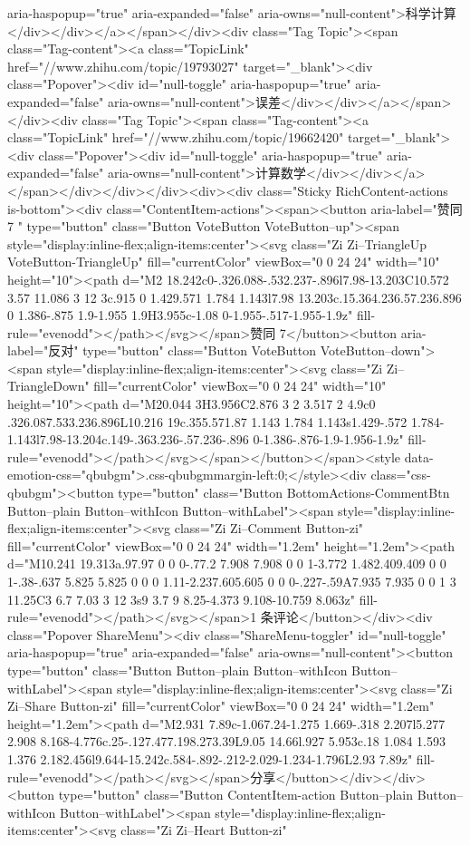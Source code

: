 aria-haspopup="true" aria-expanded="false" aria-owns="null-content">科学计算</div></div></a></span></div><div class="Tag Topic"><span class="Tag-content"><a class="TopicLink" href="//www.zhihu.com/topic/19793027" target="_blank"><div class="Popover"><div id="null-toggle" aria-haspopup="true" aria-expanded="false" aria-owns="null-content">误差</div></div></a></span></div><div class="Tag Topic"><span class="Tag-content"><a class="TopicLink" href="//www.zhihu.com/topic/19662420" target="_blank"><div class="Popover"><div id="null-toggle" aria-haspopup="true" aria-expanded="false" aria-owns="null-content">计算数学</div></div></a></span></div></div></div><div><div class="Sticky RichContent-actions is-bottom"><div class="ContentItem-actions"><span><button aria-label="赞同 7 " type="button" class="Button VoteButton VoteButton--up"><span style="display:inline-flex;align-items:center">​<svg class="Zi Zi--TriangleUp VoteButton-TriangleUp" fill="currentColor" viewBox="0 0 24 24" width="10" height="10"><path d="M2 18.242c0-.326.088-.532.237-.896l7.98-13.203C10.572 3.57 11.086 3 12 3c.915 0 1.429.571 1.784 1.143l7.98 13.203c.15.364.236.57.236.896 0 1.386-.875 1.9-1.955 1.9H3.955c-1.08 0-1.955-.517-1.955-1.9z" fill-rule="evenodd"></path></svg></span>赞同 7</button><button aria-label="反对" type="button" class="Button VoteButton VoteButton--down"><span style="display:inline-flex;align-items:center">​<svg class="Zi Zi--TriangleDown" fill="currentColor" viewBox="0 0 24 24" width="10" height="10"><path d="M20.044 3H3.956C2.876 3 2 3.517 2 4.9c0 .326.087.533.236.896L10.216 19c.355.571.87 1.143 1.784 1.143s1.429-.572 1.784-1.143l7.98-13.204c.149-.363.236-.57.236-.896 0-1.386-.876-1.9-1.956-1.9z" fill-rule="evenodd"></path></svg></span></button></span><style data-emotion-css="qbubgm">.css-qbubgm{margin-left:0;}</style><div class="css-qbubgm"><button type="button" class="Button BottomActions-CommentBtn Button--plain Button--withIcon Button--withLabel"><span style="display:inline-flex;align-items:center">​<svg class="Zi Zi--Comment Button-zi" fill="currentColor" viewBox="0 0 24 24" width="1.2em" height="1.2em"><path d="M10.241 19.313a.97.97 0 0 0-.77.2 7.908 7.908 0 0 1-3.772 1.482.409.409 0 0 1-.38-.637 5.825 5.825 0 0 0 1.11-2.237.605.605 0 0 0-.227-.59A7.935 7.935 0 0 1 3 11.25C3 6.7 7.03 3 12 3s9 3.7 9 8.25-4.373 9.108-10.759 8.063z" fill-rule="evenodd"></path></svg></span>1 条评论</button></div><div class="Popover ShareMenu"><div class="ShareMenu-toggler" id="null-toggle" aria-haspopup="true" aria-expanded="false" aria-owns="null-content"><button type="button" class="Button Button--plain Button--withIcon Button--withLabel"><span style="display:inline-flex;align-items:center">​<svg class="Zi Zi--Share Button-zi" fill="currentColor" viewBox="0 0 24 24" width="1.2em" height="1.2em"><path d="M2.931 7.89c-1.067.24-1.275 1.669-.318 2.207l5.277 2.908 8.168-4.776c.25-.127.477.198.273.39L9.05 14.66l.927 5.953c.18 1.084 1.593 1.376 2.182.456l9.644-15.242c.584-.892-.212-2.029-1.234-1.796L2.93 7.89z" fill-rule="evenodd"></path></svg></span>分享</button></div></div><button type="button" class="Button ContentItem-action Button--plain Button--withIcon Button--withLabel"><span style="display:inline-flex;align-items:center">​<svg class="Zi Zi--Heart Button-zi" 
